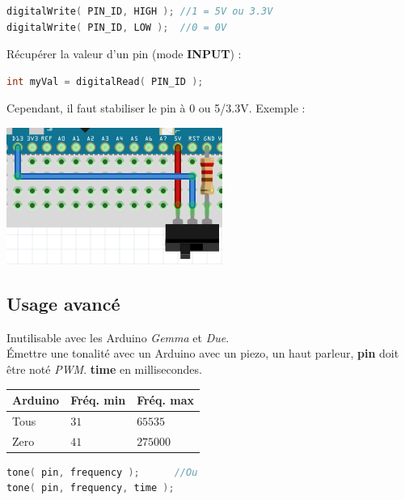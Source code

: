             \begin{lstlisting}[language=C]
digitalWrite( PIN_ID, HIGH ); //1 = 5V ou 3.3V
digitalWrite( PIN_ID, LOW );  //0 = 0V
            \end{lstlisting}

            Récupérer la valeur d'un pin (mode \textbf{INPUT}) :

            \begin{lstlisting}[language=C]
int myVal = digitalRead( PIN_ID );
            \end{lstlisting}

            Cependant, il faut stabiliser le pin à 0 ou 5/3.3V. Exemple :

            \begin{center}
                \includegraphics[scale=0.5]{img/arduino-1}
            \end{center}


        \subsection{Usage avancé}
            Inutilisable avec les Arduino \textit{Gemma} et \textit{Due}.\\
            Émettre une tonalité avec un Arduino avec un piezo, un haut parleur,
            \textbf{pin} doit être noté \textit{PWM}. \textbf{time} en millisecondes.

            \begin{center}
                 \begin{tabular}{| l | l | l |}
                    \hline
                        Arduino & Fréq. min & Fréq. max \\
                    \hline
                        Tous & $31$ & $65535$ \\
                        Zero & $41$ & $275000$ \\
                    \hline
                \end{tabular}
            \end{center}
            \begin{lstlisting}[language=C]
tone( pin, frequency );      //Ou
tone( pin, frequency, time );
            \end{lstlisting}

